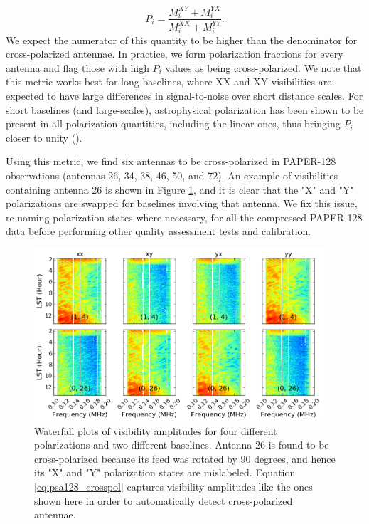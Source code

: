 \begin{equation}
\label{eq:psa128_crosspol}
P_{i} = \frac{M_{i}^{XY} + M_{i}^{YX}}{M_{i}^{XX} + M_{i}^{YY}}.
\end{equation}
We expect the numerator of this quantity to be higher than the denominator for cross-polarized antennae. In practice, we form polarization fractions for every antenna and flag those with high $P_{i}$ values as being cross-polarized. We note that this metric works best for long baselines, where XX and XY visibilities are expected to have large differences in signal-to-noise over short distance scales. For short baselines (and large-scales), astrophysical polarization has been shown to be present in all polarization quantities, including the linear ones, thus bringing $P_{i}$ closer to unity (\citealt{lenc_et_al2016}).

Using this metric, we find six antennas to be cross-polarized in PAPER-128 observations (antennas 26, 34, 38, 46, 50, and 72). An example of visibilities containing antenna 26 is shown in Figure \ref{fig:psa128_crosspol}, and it is clear that the "X" and "Y" polarizations are swapped for baselines involving that antenna. We fix this issue, re-naming polarization states where necessary, for all the compressed PAPER-128 data before performing other quality assessment tests and calibration.

\begin{figure}
	\centering
	\includegraphics[width=0.96\textwidth]{plots/psa128_crosspol.png}
	\caption{Waterfall plots of visibility amplitudes for four different polarizations and two different baselines. Antenna 26 is found to be cross-polarized because its feed was rotated by 90 degrees, and hence its "X" and "Y" polarization states are mislabeled. Equation \eqref{eq:psa128_crosspol} captures visibility amplitudes like the ones shown here in order to automatically detect cross-polarized antennae.}
	\label{fig:psa128_crosspol}
\end{figure}

